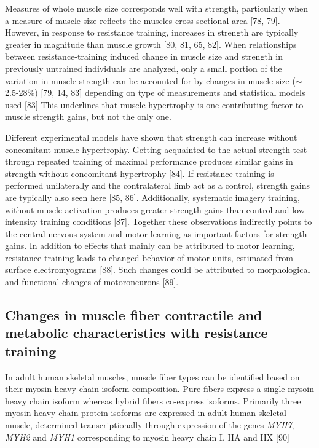 \documentclass[twoside,10pt]{gihclass} %
\begin{document}
Measures of whole muscle size corresponds well with strength, particularly when a measure of muscle size reflects the muscles cross-sectional area
{[}78, 79{]}.
However, in response to resistance training, increases in strength are typically greater in magnitude than muscle growth
{[}80, 81, 65, 82{]}.
When relationships between resistance-training induced change in muscle size and strength in previously untrained individuals are analyzed, only a small portion of the variation in muscle strength can be accounted for by changes in muscle size (\(\sim\) 2.5-28\%)
{[}79, 14, 83{]}
depending on type of measurements and statistical models used
{[}83{]}
This underlines that muscle hypertrophy is one contributing factor to muscle strength gains, but not the only one.

Different experimental models have shown that strength can increase without concomitant muscle hypertrophy.
Getting acquainted to the actual strength test through repeated training of maximal performance produces similar gains in strength without concomitant hypertrophy
{[}84{]}.
If resistance training is performed unilaterally and the contralateral limb act as a control, strength gains are typically also seen here
{[}85, 86{]}.
Additionally, systematic imagery training, without muscle activation produces greater strength gains than control and low-intensity training conditions
{[}87{]}.
Together these observations indirectly points to the central nervous system and motor learning as important factors for strength gains.
In addition to effects that mainly can be attributed to motor learning, resistance training leads to changed behavior of motor units, estimated from surface electromyograms
{[}88{]}.
Such changes could be attributed to morphological and functional changes of motoroneurons
{[}89{]}.

\hypertarget{changes-in-muscle-fiber-contractile-and-metabolic-characteristics-with-resistance-training}{%
\subsection{Changes in muscle fiber contractile and metabolic characteristics with resistance training}\label{changes-in-muscle-fiber-contractile-and-metabolic-characteristics-with-resistance-training}}

In adult human skeletal muscles, muscle fiber types can be identified based on their myosin heavy chain isoform composition. Pure fibers express a single mysoin heavy chain isoform whereas hybrid fibers co-express isoforms.
Primarily three myosin heavy chain protein isoforms are expressed in adult human skeletal muscle, determined transcriptionally through expression of the genes \emph{MYH7}, \emph{MYH2} and \emph{MYH1} corresponding to myosin heavy chain I, IIA and IIX
{[}90{]}
\end{document}
